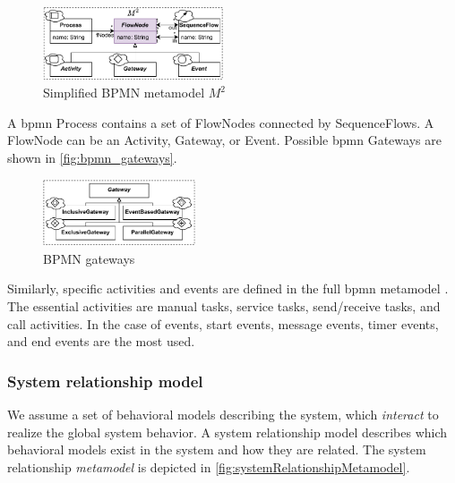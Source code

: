 \documentclass{jot}
\begin{document}
\begin{figure}[h]
    \centering
    \includegraphics[width=0.475\textwidth]{figures/bpmn_metamodel.pdf}
    \caption{Simplified BPMN metamodel $M^2$ \cite{objectmanagementgroupBusinessProcessModel2013}}
    \label{fig:bpmn_metamodel}
\end{figure}

A \gls*{bpmn} \textsf{Process} contains a set of \textsf{FlowNode}s connected by \textsf{SequenceFlow}s.
A \textsf{FlowNode} can be an \textsf{Activity}, \textsf{Gateway}, or \textsf{Event}.
Possible \gls*{bpmn} \textsf{Gateway}s are shown in \autoref{fig:bpmn_gateways}.

\begin{figure}[h]
    \centering
    \includegraphics[width=0.4\textwidth]{figures/gateways.pdf}
    \caption{BPMN gateways \cite{objectmanagementgroupBusinessProcessModel2013}}
    \label{fig:bpmn_gateways}
\end{figure}

Similarly, specific activities and events are defined in the full \gls*{bpmn} metamodel \cite[Figure 10.6/10.69]{objectmanagementgroupBusinessProcessModel2013}.
The essential activities are manual tasks, service tasks, send/receive tasks, and call activities.
In the case of events, start events, message events, timer events, and end events are the most used.

\subsubsection{System relationship model}
We assume a set of behavioral models describing the system, which \emph{interact} to realize the global system behavior.
A system relationship model describes which behavioral models exist in the system and how they are related.
The system relationship \emph{metamodel} is depicted in \autoref{fig:systemRelationshipMetamodel}.
\end{document}

